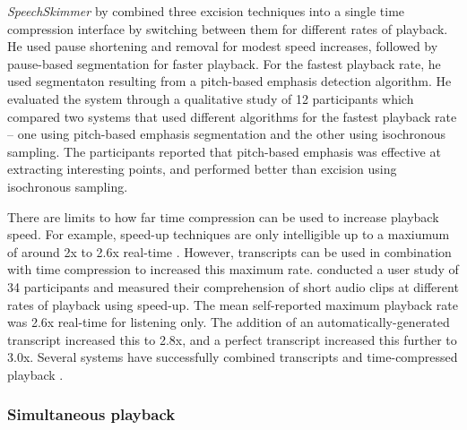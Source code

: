 \textit{SpeechSkimmer} by \citet{Arons1997} combined three excision techniques into a single time compression interface
by switching between them for different rates of playback. He used pause shortening and removal for modest speed
increases, followed by pause-based segmentation for faster playback. For the fastest playback rate, he used segmentaton
resulting from a pitch-based emphasis detection algorithm. He evaluated the system through a qualitative study of 12
participants which compared two systems that used different algorithms for the fastest playback rate -- one using
pitch-based emphasis segmentation and the other using isochronous sampling. The participants reported that pitch-based
emphasis was effective at extracting interesting points, and performed better than excision using isochronous sampling.

There are limits to how far time compression can be used to increase playback speed.  For example, speed-up techniques
are only intelligible up to a maxiumum of around 2x to 2.6x real-time
\citep{Vemuri2004,Tucker2006,Ranjan2006,Arons1997}.  However, transcripts can be used in combination with time
compression to increased this maximum rate.  \citet{Vemuri2004} conducted a user study of 34 participants and measured
their comprehension of short audio clips at different rates of playback using speed-up. The mean self-reported maximum
playback rate was 2.6x real-time for listening only. The addition of an automatically-generated transcript increased
this to 2.8x, and a perfect transcript increased this further to 3.0x.  Several systems have successfully combined
transcripts and time-compressed playback \citep{Whittaker2002}.



\subsubsection{Simultaneous playback}

